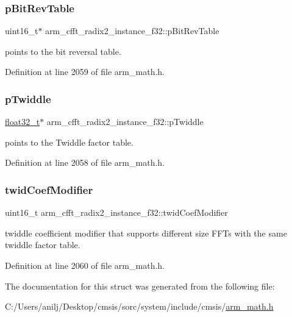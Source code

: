 \subsubsection{\texorpdfstring{p\+Bit\+Rev\+Table}{pBitRevTable}}
{\footnotesize\ttfamily uint16\+\_\+t$\ast$ arm\+\_\+cfft\+\_\+radix2\+\_\+instance\+\_\+f32\+::p\+Bit\+Rev\+Table}

points to the bit reversal table. 

Definition at line 2059 of file arm\+\_\+math.\+h.

\mbox{\label{structarm__cfft__radix2__instance__f32_adb0c9d47dbfbd90a6f6ed0a05313a974}} 
\subsubsection{\texorpdfstring{p\+Twiddle}{pTwiddle}}
{\footnotesize\ttfamily \hyperlink{arm__math_8h_a4611b605e45ab401f02cab15c5e38715}{float32\+\_\+t}$\ast$ arm\+\_\+cfft\+\_\+radix2\+\_\+instance\+\_\+f32\+::p\+Twiddle}

points to the Twiddle factor table. 

Definition at line 2058 of file arm\+\_\+math.\+h.

\mbox{\label{structarm__cfft__radix2__instance__f32_a411f75b6ed01690293f4f5988030ea42}} 
\subsubsection{\texorpdfstring{twid\+Coef\+Modifier}{twidCoefModifier}}
{\footnotesize\ttfamily uint16\+\_\+t arm\+\_\+cfft\+\_\+radix2\+\_\+instance\+\_\+f32\+::twid\+Coef\+Modifier}

twiddle coefficient modifier that supports different size F\+F\+Ts with the same twiddle factor table. 

Definition at line 2060 of file arm\+\_\+math.\+h.



The documentation for this struct was generated from the following file\+:\begin{DoxyCompactItemize}
\item 
C\+:/\+Users/anilj/\+Desktop/cmsis/sorc/system/include/cmsis/\hyperlink{arm__math_8h}{arm\+\_\+math.\+h}\end{DoxyCompactItemize}
